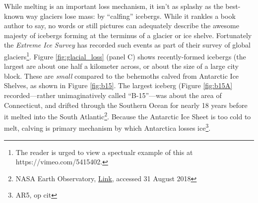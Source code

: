 \documentclass[amstex,12pt]{book}
\begin{document}
While melting is an important loss mechanism, it isn't as splashy as the best-known way glaciers lose mass: by ``calfing'' icebergs. While it rankles a book author to say, no words or still pictures can adequately describe the awesome majesty of icebergs forming at the terminus of a glacier or ice shelve. Fortunately the \textit{Extreme Ice Survey} has recorded such events as part of their survey of global glaciers\footnote{The reader is urged to view a spectualr example of this at https://vimeo.com/5415402.}. Figure \ref{fig:glacial_loss} (panel C) shows recently-formed icebergs (the largest are about one half a kilometer across, or about the size of a large city block. These are \emph{small} compared to the behemoths calved from Antarctic Ice Shelves, as shown in Figure \ref{fig:b15}. The largest iceberg (Figure \ref{fig:b15A} recorded---rather unimaginatively called ``B-15''---was about the area of Connecticut, and drifted through the Southern Ocean for nearly 18 years before it melted into the South Atlantic\footnote{NASA Earth Observatory, \href{https://earthobservatory.nasa.gov/images/92238/end-of-the-journey-for-iceberg-b-15z}{Link}, accessed 31 August 2018}. Because the Antarctic Ice Sheet is too cold to melt, calving is primary mechanism by which Antarctica losses ice\footnote{AR5, op cit}. \\
\end{document}
